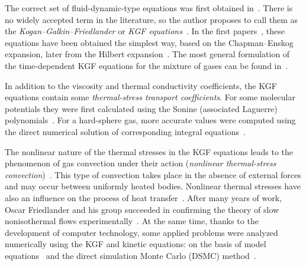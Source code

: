 \documentclass[10pt]{article}
\begin{document}
The correct set of fluid-dynamic-type equations was first obtained in~\cite{Kogan1970}.
There is no widely accepted term in the literature, so the author proposes to call them as
the \emph{Kogan--Galkin--Friedlander} or \emph{KGF equations}~\cite{Kogan1976}.
In the first papers~\cite{Kogan1970, Kogan1971}, these equations have been obtained the simplest way,
based on the Chapman--Enskog expansion, later from the Hilbert expansion~\cite{Galkin1974}.
The most general formulation of the time-dependent KGF equations for the mixture of gases can be found in~\cite{Galkin2015}.

In addition to the viscosity and thermal conductivity coefficients, the KGF equations contain
some \emph{thermal-stress transport coefficients}.
For some molecular potentials they were first calculated using the Sonine (associated Laguerre)
polynomials~\cite{Burnett1935, Chapman1970}.
For a hard-sphere gas, more accurate values were computed using the
direct numerical solution of corresponding integral equations~\cite{Sone1996, Sone2002, Sone2007}.

The nonlinear nature of the thermal stresses in the KGF equations leads to the phenomenon of gas convection
under their action (\emph{nonlinear thermal-stress convection})~\cite{Kogan1971}.
This type of convection takes place in the absence of external forces and may occur between uniformly heated bodies.
Nonlinear thermal stresses have also an influence on the process of heat transfer~\cite{Friedlander1978}.
After many years of work, Oscar Friedlander and his group succeeded in confirming
the theory of slow nonisothermal flows experimentally~\cite{Friedlander1997, Friedlander2003}.
At the same time, thanks to the development of computer technology,
some applied problems were analyzed numerically using the KGF and kinetic equations:
on the basis of model equations~\cite{Alexandrov2002, Aoki2006, Alexandrov2008b, Alexandrov2011, Rykov2008}
and the direct simulation Monte Carlo (DSMC) method~\cite{Alexandrov2008a, Aoki2007}.
\end{document}
